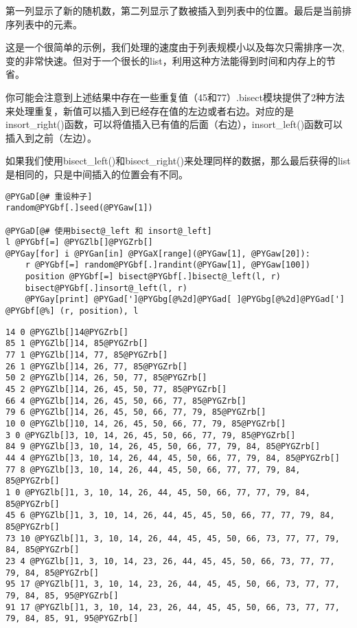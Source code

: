 \documentclass[letterpaper,10pt,english]{manual}
\begin{document}
第一列显示了新的随机数，第二列显示了数被插入到列表中的位置。最后是当前排序列表中的元素。

这是一个很简单的示例，我们处理的速度由于列表规模小以及每次只需排序一次, 变的非常快速。但对于一个很长的list，利用这种方法能得到时间和内存上的节省。

你可能会注意到上述结果中存在一些重复值（45和77）.bisect模块提供了2种方法来处理重复，新值可以插入到已经存在值的左边或者右边。对应的是 insort\_right()函数，可以将值插入已有值的后面（右边），insort\_left()函数可以插入到之前（左边）。

如果我们使用bisect\_left()和bisect\_right()来处理同样的数据，那么最后获得的list是相同的，只是中间插入的位置会有不同。

\begin{Verbatim}[commandchars=@\[\]]
@PYGaD[@# 重设种子]
random@PYGbf[.]seed(@PYGaw[1])

@PYGaD[@# 使用bisect@_left 和 insort@_left]
l @PYGbf[=] @PYGZlb[]@PYGZrb[]
@PYGay[for] i @PYGan[in] @PYGaX[range](@PYGaw[1], @PYGaw[20]):
    r @PYGbf[=] random@PYGbf[.]randint(@PYGaw[1], @PYGaw[100])
    position @PYGbf[=] bisect@PYGbf[.]bisect@_left(l, r)
    bisect@PYGbf[.]insort@_left(l, r)
    @PYGay[print] @PYGad[']@PYGbg[@%2d]@PYGad[ ]@PYGbg[@%2d]@PYGad['] @PYGbf[@%] (r, position), l
\end{Verbatim}

\begin{Verbatim}[commandchars=@\[\]]
14 0 @PYGZlb[]14@PYGZrb[]
85 1 @PYGZlb[]14, 85@PYGZrb[]
77 1 @PYGZlb[]14, 77, 85@PYGZrb[]
26 1 @PYGZlb[]14, 26, 77, 85@PYGZrb[]
50 2 @PYGZlb[]14, 26, 50, 77, 85@PYGZrb[]
45 2 @PYGZlb[]14, 26, 45, 50, 77, 85@PYGZrb[]
66 4 @PYGZlb[]14, 26, 45, 50, 66, 77, 85@PYGZrb[]
79 6 @PYGZlb[]14, 26, 45, 50, 66, 77, 79, 85@PYGZrb[]
10 0 @PYGZlb[]10, 14, 26, 45, 50, 66, 77, 79, 85@PYGZrb[]
3 0 @PYGZlb[]3, 10, 14, 26, 45, 50, 66, 77, 79, 85@PYGZrb[]
84 9 @PYGZlb[]3, 10, 14, 26, 45, 50, 66, 77, 79, 84, 85@PYGZrb[]
44 4 @PYGZlb[]3, 10, 14, 26, 44, 45, 50, 66, 77, 79, 84, 85@PYGZrb[]
77 8 @PYGZlb[]3, 10, 14, 26, 44, 45, 50, 66, 77, 77, 79, 84, 85@PYGZrb[]
1 0 @PYGZlb[]1, 3, 10, 14, 26, 44, 45, 50, 66, 77, 77, 79, 84, 85@PYGZrb[]
45 6 @PYGZlb[]1, 3, 10, 14, 26, 44, 45, 45, 50, 66, 77, 77, 79, 84, 85@PYGZrb[]
73 10 @PYGZlb[]1, 3, 10, 14, 26, 44, 45, 45, 50, 66, 73, 77, 77, 79, 84, 85@PYGZrb[]
23 4 @PYGZlb[]1, 3, 10, 14, 23, 26, 44, 45, 45, 50, 66, 73, 77, 77, 79, 84, 85@PYGZrb[]
95 17 @PYGZlb[]1, 3, 10, 14, 23, 26, 44, 45, 45, 50, 66, 73, 77, 77, 79, 84, 85, 95@PYGZrb[]
91 17 @PYGZlb[]1, 3, 10, 14, 23, 26, 44, 45, 45, 50, 66, 73, 77, 77, 79, 84, 85, 91, 95@PYGZrb[]
\end{Verbatim}
\end{document}
